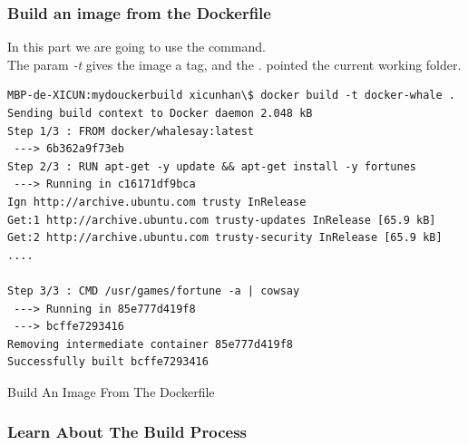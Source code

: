 \documentclass[12pt,a4paper]{article}
\begin{document}
\subsubsection{Build an image from the Dockerfile}

In this part we are going to use the \textit{{\color{violet}{docker build}}} command. \\

The param \textit{-t} gives the image a tag, and the \emph{.} pointed the current working folder.\\

\begin{listing}[ht]
 \begin{verbatim}
MBP-de-XICUN:mydouckerbuild xicunhan\$ docker build -t docker-whale .
Sending build context to Docker daemon 2.048 kB
Step 1/3 : FROM docker/whalesay:latest
 ---> 6b362a9f73eb
Step 2/3 : RUN apt-get -y update && apt-get install -y fortunes
 ---> Running in c16171df9bca
Ign http://archive.ubuntu.com trusty InRelease
Get:1 http://archive.ubuntu.com trusty-updates InRelease [65.9 kB]
Get:2 http://archive.ubuntu.com trusty-security InRelease [65.9 kB]
....

Step 3/3 : CMD /usr/games/fortune -a | cowsay
 ---> Running in 85e777d419f8
 ---> bcffe7293416
Removing intermediate container 85e777d419f8
Successfully built bcffe7293416

\end{verbatim}
\label{code:7}
\caption{Build An Image From The Dockerfile}
 \end{listing}
\FloatBarrier

\subsubsection{Learn About The Build Process}
\end{document}
